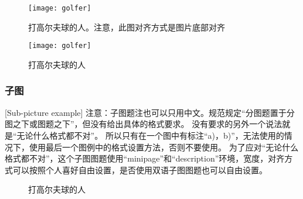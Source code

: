 \begin{figure}[htbp]
	\centering
	\begin{minipage}[t]{0.4\textwidth}
		\centering
		\texttt{[image: golfer]}
		\caption{打高尔夫球的人。注意，此图对齐方式是图片底部对齐}
	\end{minipage}
	\centering
	\begin{minipage}[t]{0.4\textwidth}
		\centering
		\texttt{[image: golfer]}
		\caption{打高尔夫球的人}
	\end{minipage}
\end{figure}

\subsubsection{子图}[Sub-picture example]
注意：子图题注也可以只用中文。规范规定“分图题置于分图之下或图题之下”，但没有给出具体的格式要求。
没有要求的另外一个说法就是“无论什么格式都不对”。
所以只有在一个图中有标注“a)，b)”，无法使用的情况下，使用最后一个图例中的格式设置方法，否则不要使用。
为了应对“无论什么格式都不对”，这个子图图题使用“minipage”和“description”环境，宽度，对齐方式可以按照个人喜好自由设置，是否使用双语子图图题也可以自由设置。

\begin{figure}[!h]
	\setlength{\subfigcapskip}{-1bp}
	\centering
	\begin{minipage}{\textwidth}
		\centering
		\hspace{2em}
	\end{minipage}
	\centering
	\begin{minipage}{\textwidth}
		\centering
		\hspace{2em}
	\end{minipage}
	\vspace{0.2em}
	\caption{打高尔夫球的人}
\end{figure}

